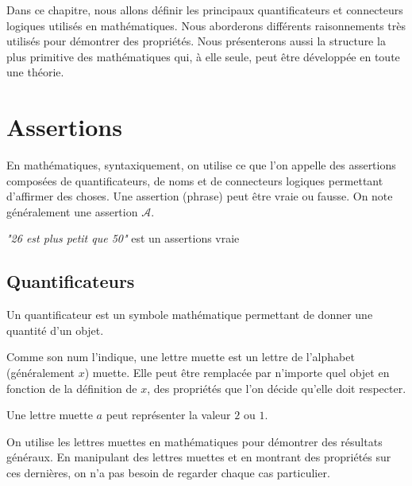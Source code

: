 
\minitoc

Dans ce chapitre, nous allons définir les principaux quantificateurs et connecteurs logiques utilisés en mathématiques. 
Nous aborderons différents raisonnements très utilisés pour démontrer des propriétés. 
Nous présenterons aussi la structure la plus primitive des mathématiques qui, à elle seule, peut être développée en 
toute une théorie. 


\section{Assertions}

En mathématiques, syntaxiquement, on utilise ce que l'on appelle des assertions composées de quantificateurs, de noms 
et de connecteurs logiques permettant d'affirmer des choses. Une assertion (phrase) peut être vraie ou fausse. 
On note généralement une assertion $\mathcal{A}$. 

\begin{example}
    \emph{"26 est plus petit que 50"} est un assertions vraie 
\end{example}

\subsection{Quantificateurs}

Un quantificateur est un symbole mathématique permettant de donner une quantité d'un objet. 

\begin{definition}
    Comme son num l'indique, une lettre muette est un lettre de l'alphabet (généralement $x$) muette. 
    Elle peut être remplacée par n'importe quel objet en fonction de la définition de $x$, des propriétés 
    que l'on décide qu'elle doit respecter. 
\end{definition}

\begin{example}
    Une lettre muette $a$ peut représenter la valeur $2$ ou $1$. 
\end{example}

On utilise les lettres muettes en mathématiques pour démontrer des résultats généraux. 
En manipulant des lettres muettes et en montrant des propriétés sur ces dernières, on n'a pas besoin de regarder chaque 
cas particulier. 

